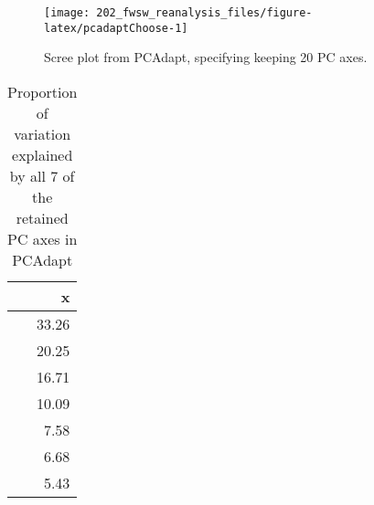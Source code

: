 \documentclass[11pt,]{article}
\newenvironment{Shaded}{\begin{snugshade}}{\end{snugshade}}
\newcommand{\KeywordTok}[1]{\textcolor[rgb]{0.13,0.29,0.53}{\textbf{#1}}}
\newcommand{\DataTypeTok}[1]{\textcolor[rgb]{0.13,0.29,0.53}{#1}}
\newcommand{\DecValTok}[1]{\textcolor[rgb]{0.00,0.00,0.81}{#1}}
\newcommand{\StringTok}[1]{\textcolor[rgb]{0.31,0.60,0.02}{#1}}
\newcommand{\OperatorTok}[1]{\textcolor[rgb]{0.81,0.36,0.00}{\textbf{#1}}}
\newcommand{\NormalTok}[1]{#1}
\begin{document}
\begin{figure}[H]
\texttt{[image: 202\_fwsw\_reanalysis\_files/figure-latex/pcadaptChoose-1]} \caption{Scree plot from PCAdapt, specifying keeping 20 PC axes.}\label{fig:pcadaptChoose}
\end{figure}

\begin{Shaded}
\end{Shaded}

\begin{table}

\caption{\label{tab:pcadaptAnalyze}Proportion of variation explained by all 7 of the retained PC axes in PCAdapt}
\centering
\begin{tabular}[t]{r}
\hline
x\\
\hline
33.26\\
\hline
20.25\\
\hline
16.71\\
\hline
10.09\\
\hline
7.58\\
\hline
6.68\\
\hline
5.43\\
\hline
\end{tabular}
\end{table}
\end{document}
